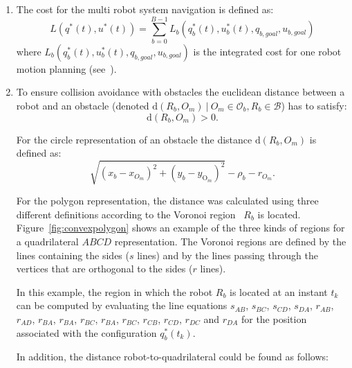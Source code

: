 \documentclass[eprint]{actapoly}
\begin{document}
\begin{enumerate}
    \item The cost for the multi robot system navigation is defined as:
    \begin{equation}
        L(q^*(t),u^*(t)) = \sum_{b=0}^{B-1}L_b(q^*_b(t), u^*_b(t), q_{b,goal},u_{b,goal})
    \end{equation}
    where $L_b(q^*_b(t), u^*_b(t), q_{b,goal},u_{b,goal})$ is the 
    integrated cost for one robot
    motion planning (see~\cite{Defoort2009}).
    
    \item 
    To ensure collision avoidance with obstacles the euclidean 
    distance between
    a robot and an obstacle (denoted $\mathrm{d}(R_b, O_m)\ |\ O_m
    \in \mathcal{O}_b, R_b \in \mathcal{B} $) has to satisfy:
    \begin{equation}
    	\mathrm{d}(R_b, O_m) > 0.
    \end{equation}
    
    For the circle representation of an obstacle the distance
    $\mathrm{d}(R_b, O_m)$ is defined as:
    \begin{equation*}
        \sqrt{(x_{b} - x_{O_m})^2 + (y_{b} - y_{\mathrm{O}_m})^2}  - \rho_b - r_{O_m}.
    \end{equation*}
    
    For the polygon representation, the distance was calculated using three different
    definitions according to the Voronoi region~\cite{ericson2004real}
    $R_b$ is located. Figure~\ref{fig:convexpolygon} shows an example of the three kinds
    of regions for a quadrilateral $ABCD$ representation. The Voronoi regions are 
    defined by
    the lines containing the sides ($s$ lines) and by the lines passing
    through the vertices that are orthogonal to the sides ($r$ lines).    
    
	In this example, the region in which the robot $R_b$ is located
	at an instant $t_k$
	can be computed by evaluating the line
 	equations 
 	$s_{AB}$, $s_{BC}$, $s_{CD}$, $s_{DA}$, $r_{AB}$, $r_{AD}$, $r_{BA}$, $r_{BA}$,
 	$r_{BC}$, $r_{BA}$, $r_{BC}$, $r_{CB}$, $r_{CD}$, $r_{DC}$ and $r_{DA}$ for 
 	the position associated with the configuration $q^*_b(t_k)$.
 	
    
    In addition, the distance
    robot-to-quadrilateral could be found as follows:
    \begin{enumerate}
    

\end{enumerate}
\end{enumerate}
\end{document}
